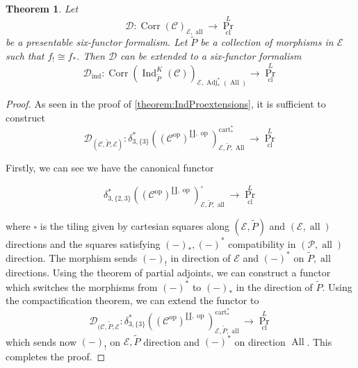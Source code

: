 \documentclass[14pt]{article}
\newtheorem{theorem}{Theorem}[subsection]
\theoremstyle{definition}
\newcommand{\E}{\mathcal{E}}
\newcommand{\D}{\mathcal{D}}
\renewcommand{\P}{\mathcal{P}}
\newcommand{\op}[1]{\operatorname{#1}}
\newcommand{\dd}{\delta}
\newcommand{\Ca}{\mathcal{C}}
\numberwithin{subsection}{section}
\newcommand{\bx}{\square}
\begin{document}
\begin{theorem}\label{Theorem:ExtendingIndGeneralSetup}
    Let 
    \begin{equation}
        \D : \op{Corr}(\Ca)_{\E,\op{all}} \to \op{Pr}^L_{\op{cl}}
    \end{equation}
    be a presentable six-functor formalism. Let $\tilde{P}$ be a collection of morphisms in $\E$ such that $f_! \cong f_*$. Then $\D$ can be extended to a  six-functor formalism
    \begin{equation}
        \D_{\op{ind}} : \op{Corr}(\op{Ind}^K_{\tilde{P}}(\Ca))_{\E,\op{Adj}^*_*(\op{All})} \to \op{Pr}^L_{\op{cl}}
    \end{equation}
\end{theorem}
\begin{proof}
    As seen in the proof of \cref{theorem:IndProextensions}, it is sufficient to construct 
    \begin{equation}
        \D_{(\Ca,\tilde{P},\E)} : \dd^*_{3,\{3\}}((\Ca^{\op{op}})^{\amalg,\op{op}})^{\op{cart}^*_*}_{\E,\tilde{P},\op{All}} \to \op{Pr}^L_{\op{cl}}    \end{equation}

        Firstly, we can see we have the canonical functor

        \begin{equation}
            \dd^*_{3,\{2,3\}}((\Ca^{\op{op}})^{\amalg,\op{op}})^{\bx}_{\E,\tilde{P},\op{all}} \to \op{Pr}^L_{\op{cl}} 
        \end{equation}

where $\bx$ is the tiling given by cartesian squares along $(\E,\tilde{P})$ and $(\E,\op{all})$ directions and the squares satisfying $(-)_*,(-)^*$ compatibility in $(\P,\op{all})$ direction. The morphism sends $(-)_!$ in direction of $\E$ and $(-)^*$ on $\tilde{P},\op{all}$ directions. Using the theorem of partial adjoints, we can construct a functor which switches the morphisms from $(-)^*$ to $(-)_*$ in the direction of $\tilde{P}$. Using the compactification theorem, we can extend the functor to
\begin{equation}
    \D_{(\Ca,\tilde{P},\E}:  \dd^*_{3,\{3\}}((\Ca^{\op{op}})^{\amalg,\op{op}})^{\op{cart}^*_*}_{\E,\tilde{P},\op{all}} \to \op{Pr}^L_{\op{cl}} 
\end{equation}
which sends now $(-)_!$ on $\E,\tilde{P}$ direction and $(-)^*$ on direction $\op{All}$. This completes the proof. 

\end{proof}
\end{document}

